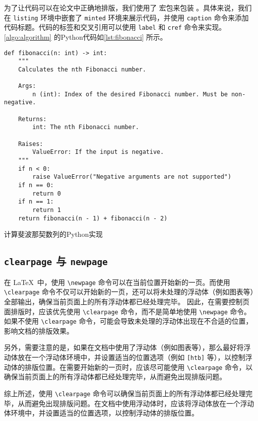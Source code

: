 为了让代码可以在论文中正确地排版，我们使用了  宏包来包装 。具体来说，我们在 \texttt{listing} 环境中嵌套了 \texttt{minted} 环境来展示代码，并使用 \texttt{caption} 命令来添加代码标题。代码的标签和交叉引用可以使用 \texttt{label} 和 \texttt{cref} 命令来实现。
\ref{algo:algorithm} 的Python代码如\ref{lst:fibonacci} 所示。

\begin{listing}[!htb]
  \begin{verbatim}
def fibonacci(n: int) -> int:
    """
    Calculates the nth Fibonacci number.

    Args:
        n (int): Index of the desired Fibonacci number. Must be non-negative.

    Returns:
        int: The nth Fibonacci number.

    Raises:
        ValueError: If the input is negative.
    """
    if n < 0:
        raise ValueError("Negative arguments are not supported")
    if n == 0:
        return 0
    if n == 1:
        return 1
    return fibonacci(n - 1) + fibonacci(n - 2)
  \end{verbatim}
  \caption{计算斐波那契数列的Python实现}\label{lst:fibonacci}
\end{listing}

\subsection{\texttt{clearpage} 与 \texttt{newpage}}

在 \LaTeX\ 中，使用 \verb|\newpage| 命令可以在当前位置开始新的一页。而使用 \verb|\clearpage| 命令不仅可以开始新的一页，还可以将未处理的浮动体（例如图表等）全部输出，确保当前页面上的所有浮动体都已经处理完毕。
因此，在需要控制页面排版时，应该优先使用 \verb|\clearpage| 命令，而不是简单地使用 \verb|\newpage| 命令。如果不使用 \verb|\clearpage| 命令，可能会导致未处理的浮动体出现在不合适的位置，影响文档的排版效果。

另外，需要注意的是，如果在文档中使用了浮动体（例如图表等），那么最好将浮动体放在一个浮动体环境中，并设置适当的位置选项（例如 \verb|[htb]| 等），以控制浮动体的排版位置。在需要开始新的一页时，应该尽可能使用 \verb|\clearpage| 命令，以确保当前页面上的所有浮动体都已经处理完毕，从而避免出现排版问题。

综上所述，使用 \verb|\clearpage| 命令可以确保当前页面上的所有浮动体都已经处理完毕，从而避免出现排版问题。在文档中使用浮动体时，应该将浮动体放在一个浮动体环境中，并设置适当的位置选项，以控制浮动体的排版位置。